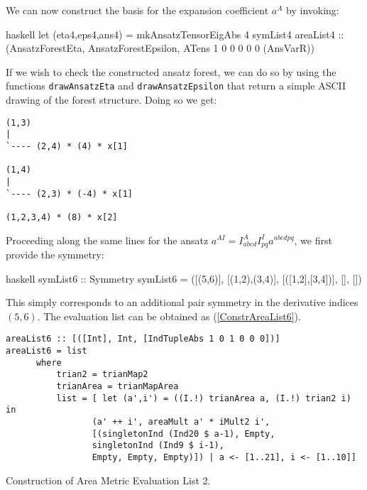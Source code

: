 We can now construct the basis for the expansion coefficient $a^{A}$ by invoking:
\begin{center}
\begin{cminted}{haskell}
let (eta4,eps4,ans4) = mkAnsatzTensorEigAbs 4 symList4 areaList4 :: 
                         (AnsatzForestEta, AnsatzForestEpsilon,
                         ATens 1 0 0 0 0 0 (AnsVarR))
\end{cminted}
\end{center}
If we wish to check the constructed ansatz forest, we can do so by using the functions \texttt{drawAnsatzEta} and \texttt{drawAnsatzEpsilon} that return a simple ASCII drawing of the forest structure. Doing so we get:
\begin{center}
\begin{BVerbatim}
(1,3)
|
`---- (2,4) * (4) * x[1]

(1,4)
|
`---- (2,3) * (-4) * x[1]

(1,2,3,4) * (8) * x[2]
\end{BVerbatim}
\end{center}
Proceeding along the same lines for the ansatz $a^{AI} = I^A _{abcd} I^I_{pq} a^{abcdpq}$, we first provide the symmetry:
\begin{center}
\begin{cminted}{haskell}
symList6 :: Symmetry
symList6 = ([(5,6)], [(1,2),(3,4)], [([1,2],[3,4])], [], [])
\end{cminted}
\end{center}
This simply corresponds to an additional pair symmetry in the derivative indices $(5,6)$. The evaluation list can be obtained as (\ref{ConstrAreaList6}).
\begin{listing}[hbt!]
\begin{verbatim}
areaList6 :: [([Int], Int, [IndTupleAbs 1 0 1 0 0 0])]
areaList6 = list
      where
          trian2 = trianMap2
          trianArea = trianMapArea
          list = [ let (a',i') = ((I.!) trianArea a, (I.!) trian2 i) in
                 (a' ++ i', areaMult a' * iMult2 i', 
                 [(singletonInd (Ind20 $ a-1), Empty,
                 singletonInd (Ind9 $ i-1),
                 Empty, Empty, Empty)]) | a <- [1..21], i <- [1..10]]
\end{verbatim} 
\caption{Construction of Area Metric Evaluation List 2.}\label{ConstrAreaList6}
\end{listing}

